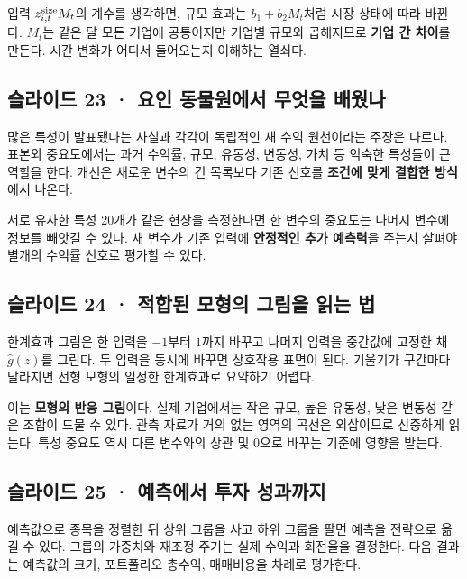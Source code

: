 \documentclass[11pt,a4paper]{article}
\begin{document}
입력 $z_{i,t}^{\rm size}M_t$의 계수를 생각하면, 규모 효과는 $b_1+b_2M_t$처럼 시장 상태에 따라 바뀐다. $M_t$는 같은 달 모든 기업에 공통이지만 기업별 규모와 곱해지므로 \textbf{기업 간 차이}를 만든다. 시간 변화가 어디서 들어오는지 이해하는 열쇠다.\par

\subsection{슬라이드 23 · 요인 동물원에서 무엇을 배웠나}
많은 특성이 발표됐다는 사실과 각각이 독립적인 새 수익 원천이라는 주장은 다르다. 표본외 중요도에서는 과거 수익률, 규모, 유동성, 변동성, 가치 등 익숙한 특성들이 큰 역할을 한다. 개선은 새로운 변수의 긴 목록보다 기존 신호를 \textbf{조건에 맞게 결합한 방식}에서 나온다.\par

서로 유사한 특성 20개가 같은 현상을 측정한다면 한 변수의 중요도는 나머지 변수에 정보를 빼앗길 수 있다. 새 변수가 기존 입력에 \textbf{안정적인 추가 예측력}을 주는지 살펴야 별개의 수익률 신호로 평가할 수 있다.\par

\subsection{슬라이드 24 · 적합된 모형의 그림을 읽는 법}
한계효과 그림은 한 입력을 $-1$부터 $1$까지 바꾸고 나머지 입력을 중간값에 고정한 채 $\hat g(z)$를 그린다. 두 입력을 동시에 바꾸면 상호작용 표면이 된다. 기울기가 구간마다 달라지면 선형 모형의 일정한 한계효과로 요약하기 어렵다.\par

이는 \textbf{모형의 반응 그림}이다. 실제 기업에서는 작은 규모, 높은 유동성, 낮은 변동성 같은 조합이 드물 수 있다. 관측 자료가 거의 없는 영역의 곡선은 외삽이므로 신중하게 읽는다. 특성 중요도 역시 다른 변수와의 상관 및 0으로 바꾸는 기준에 영향을 받는다.\par

\subsection{슬라이드 25 · 예측에서 투자 성과까지}
예측값으로 종목을 정렬한 뒤 상위 그룹을 사고 하위 그룹을 팔면 예측을 전략으로 옮길 수 있다. 그룹의 가중치와 재조정 주기는 실제 수익과 회전율을 결정한다. 다음 결과는 예측값의 크기, 포트폴리오 총수익, 매매비용을 차례로 평가한다.\par
\end{document}
